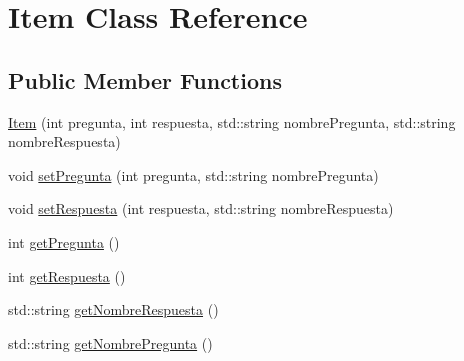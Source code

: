 \hypertarget{class_item}{\section{Item Class Reference}
\label{class_item}
}
\subsection*{Public Member Functions}
\begin{DoxyCompactItemize}
\item 
\hyperlink{class_item_a257e834a32697a46c27b93c01f472029}{Item} (int pregunta, int respuesta, std\+::string nombre\+Pregunta, std\+::string nombre\+Respuesta)
\item 
void \hyperlink{class_item_a3420ee8becee8e78a13b35b448600db4}{set\+Pregunta} (int pregunta, std\+::string nombre\+Pregunta)
\item 
void \hyperlink{class_item_a41bf97518a6993f4eb06c68fa49cd7e9}{set\+Respuesta} (int respuesta, std\+::string nombre\+Respuesta)
\item 
int \hyperlink{class_item_abb173ee1fabe46595b266c6b96599947}{get\+Pregunta} ()
\item 
int \hyperlink{class_item_a9d275c2413552a1c9c31db25d3e51f62}{get\+Respuesta} ()
\item 
std\+::string \hyperlink{class_item_ac612d90bd7e752643c43bce4ed262931}{get\+Nombre\+Respuesta} ()
\item 
std\+::string \hyperlink{class_item_ada4a8e05a11c1fbdbe6a009324b071fd}{get\+Nombre\+Pregunta} ()
\end{DoxyCompactItemize}


